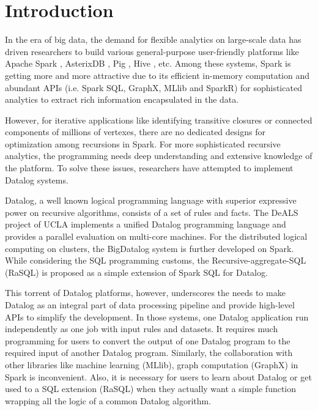 \section{Introduction}
In the era of big data, the demand for flexible analytics on large-scale data has driven researchers to build various general-purpose user-friendly platforms like Apache Spark   \citep{zaharia2012resilient}, AsterixDB \citep{alsubaiee2014asterixdb}, Pig \citep{olston2008pig}, Hive \citep{thusoo2009hive}, etc.  Among these systems, Spark is getting more and more attractive due to its efficient in-memory computation and abundant APIs (i.e. Spark SQL, GraphX, MLlib and SparkR) for sophisticated analytics  to extract rich information encapsulated in the data.

However, for iterative applications like identifying transitive closures or connected components of millions of vertexes, there are no dedicated designs for optimization among recursions in Spark.
For  more sophisticated recursive analytics, the programming needs deep understanding and extensive knowledge of the platform.  To solve these issues, researchers have attempted to implement Datalog  \citep{consens1990low} systems. 

Datalog, a well known logical programming language with superior expressive power on recursive algorithms, consists of a set of rules and facts. The DeALS project of UCLA \citep{yang2015parallel} implements a unified Datalog programming language and provides a parallel evaluation on multi-core machines. For the distributed logical computing on clusters, the BigDatalog \citep{shkapsky2016big} system is further developed on Spark. While considering the SQL programming customs, the Recursive-aggregate-SQL (RaSQL) \citep{gu2019rasql} is proposed as a simple extension of Spark SQL for Datalog.  


This torrent of Datalog platforms, however, underscores the needs to make Datalog as an integral part of data processing pipeline and provide high-level APIs to simplify the development. %
In those systems, one Datalog application run independently as one  job with input rules and datasets. It requires much programming for users to convert the output of one Datalog program to the required input of another Datalog program. Similarly, the collaboration with other libraries like machine learning (MLlib), graph computation (GraphX) in Spark is inconvenient. Also, it is necessary for users to learn about Datalog or get used to a SQL extension (RaSQL) when they actually  want a simple function wrapping all the logic of a common Datalog algorithm. 


